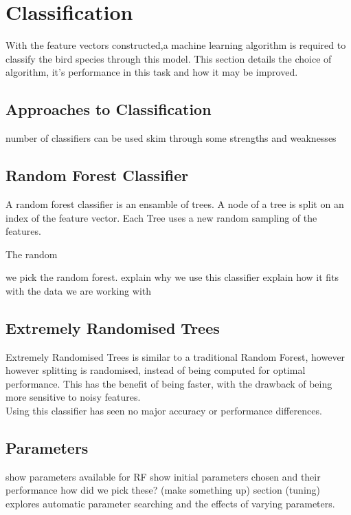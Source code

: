 \section{Classification}
With the feature vectors constructed,a machine learning algorithm is required
to classify the bird species through this model.
This section details the choice of algorithm, it's performance in this task and
how it may be improved.

\subsection{Approaches to Classification}

number of classifiers can be used
skim through some strengths and weaknesses

\subsection{Random Forest Classifier}
A random forest classifier is an ensamble of trees.
A node of a tree is split on an index of the feature vector.
Each Tree uses a new random sampling of the features.

The random 

we pick the random forest.
explain why we use this classifier
explain how it fits with the data we are working with

\subsection{Extremely Randomised Trees}
Extremely Randomised Trees is similar to a traditional Random Forest, however
however splitting is randomised, instead of being computed for optimal
performance.
This has the benefit of being faster, with the drawback of being more sensitive
to noisy features.\\

Using this classifier has seen no major accuracy or performance differences.

\subsection{Parameters}
show parameters available for RF
show initial parameters chosen and their performance
how did we pick these? (make something up)
section (tuning) explores automatic parameter searching and the
effects of varying parameters.
